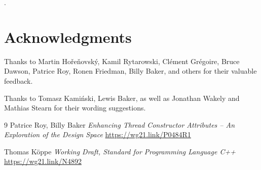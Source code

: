 \documentclass{wg21}
\begin{document}
.


\section{Acknowledgments}

Thanks to Martin Hořeňovský, Kamil Rytarowski, Clément Grégoire, Bruce Dawson, Patrice Roy, Ronen Friedman, Billy Baker, and others for their valuable feedback.

Thanks to Tomasz Kamiński, Lewis Baker, as well as Jonathan Wakely and Mathias Stearn for their wording suggestions.






\renewcommand{\section}[2]{}%
\begin{thebibliography}{9}
    Patrice Roy, Billy Baker
    \emph{Enhancing Thread Constructor Attributes – An Exploration of the Design Space}\newline
    \url{https://wg21.link/P0484R1}

    Thomas Köppe
    \emph{Working Draft, Standard for Programming Language C++}\newline
    \url{https://wg21.link/N4892}

\end{thebibliography}
\end{document}
